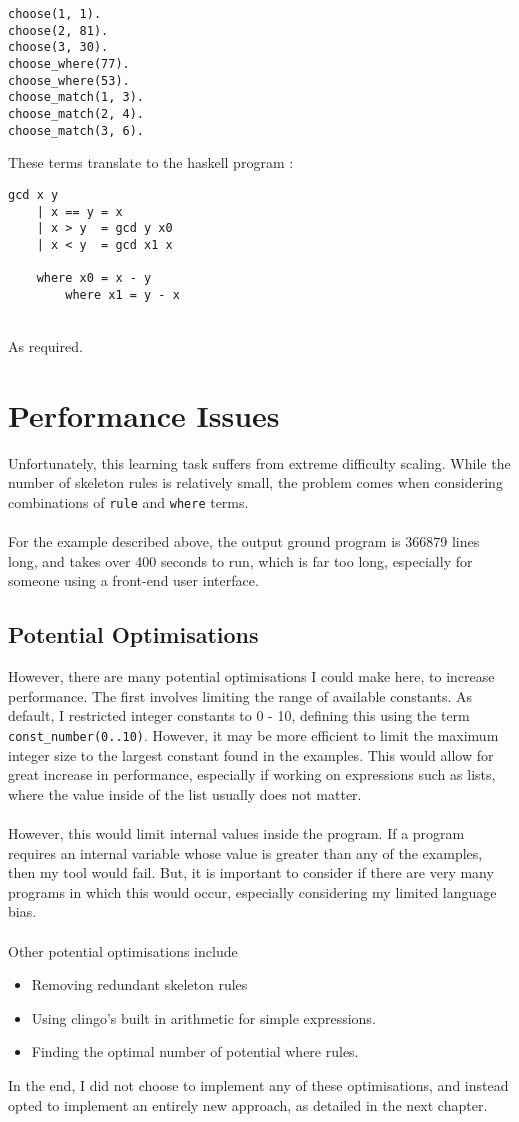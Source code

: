 \begin{lstlisting}
choose(1, 1).
choose(2, 81).
choose(3, 30).
choose_where(77).
choose_where(53).
choose_match(1, 3).
choose_match(2, 4).
choose_match(3, 6).
\end{lstlisting}


\pagebreak
These terms translate to the haskell program :

\begin{lstlisting}
gcd x y
	| x == y = x
	| x > y  = gcd y x0
	| x < y  = gcd x1 x
	
	where x0 = x - y
		where x1 = y - x
\end{lstlisting}
\mbox{}\\
As required.

\section{Performance Issues}
Unfortunately, this learning task suffers from extreme difficulty scaling. While the number of skeleton rules is relatively small, the problem comes when considering combinations of \lstinline{rule} and \lstinline{where} terms.\\ \\ %
For the example described above, the output ground program is 366879 lines long, and takes over 400 seconds to run, which is far too long, especially for someone using a front-end user interface.

\subsection{Potential Optimisations}
However, there are many potential optimisations I could make here, to increase performance. The first involves limiting the range of available constants. As default, I restricted integer constants to 0 - 10, defining this using the term \lstinline{const_number(0..10)}. However, it may be more efficient to limit the maximum integer size to the largest constant found in the examples. This would allow for great increase in performance, especially if working on expressions such as lists, where the value inside of the list usually does not matter. \\ \\ %
However, this would limit internal values inside the program. If a program requires an internal variable whose value is greater than any of the examples, then my tool would fail. But, it is important to consider if there are very many programs in which this would occur, especially considering my limited language bias. \\ \\
Other potential optimisations include
\begin{itemize}
\item Removing redundant skeleton rules
\item Using clingo's built in arithmetic for simple expressions.
\item Finding the optimal number of potential where rules.
\end{itemize}
In the end, I did not choose to implement any of these optimisations, and instead opted to implement an entirely new approach, as detailed in the next chapter.

\pagebreak
%
%
